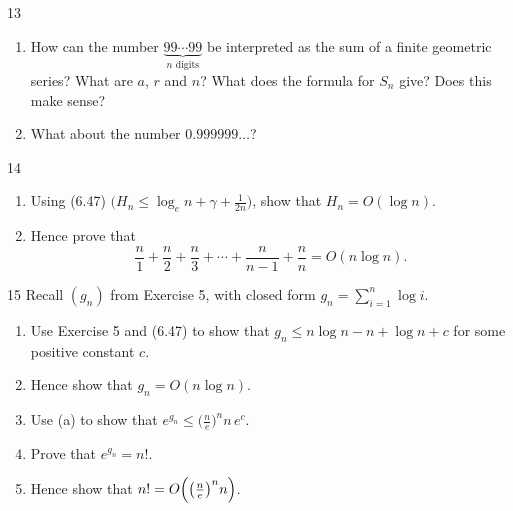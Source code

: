 \begin{exercise}{13}
    \begin{enumerate}[label=(\alph*)]
        \item How can the number $\underbrace{99\cdots99}_{n\text{ digits}}$ be
              interpreted as the sum of a finite geometric series? What are $a$,
              $r$ and $n$? What does the formula for $S_n$ give? Does this make
              sense?
        \item What about the number $0.999999\ldots$?
    \end{enumerate}
\end{exercise}

\begin{exercise}{14}
    \begin{enumerate}[label=(\alph*)]
        \item Using (6.47) $\bigl(H_n\le\log_e n+\gamma+\frac1{2n}\bigr)$, show
              that $H_n=O(\log n)$.
        \item Hence prove that
              \[
                  \frac n1+\frac n2+\frac n3+\cdots+\frac n{n-1}+\frac nn
                  = O(n\log n).
              \]
    \end{enumerate}
\end{exercise}

\begin{exercise}{15}
    Recall $(g_n)$ from Exercise 5, with closed form
    $g_n=\sum_{i=1}^n\log i$.
    \begin{enumerate}[label=(\alph*)]
        \item Use Exercise 5 and (6.47) to show that
              $g_n\le n\log n-n+\log n+c$ for some positive constant $c$.
        \item Hence show that $g_n=O(n\log n)$.
        \item Use (a) to show that $e^{g_n}\le\bigl(\frac ne\bigr)^n n\,e^c$.
        \item Prove that $e^{g_n}=n!$.
        \item Hence show that $n!=O\Bigl(\bigl(\frac ne\bigr)^n n\Bigr)$.
    \end{enumerate}
\end{exercise}
